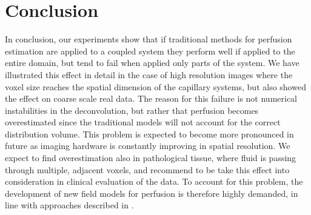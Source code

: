 \documentclass[journal,twocolumn]{IEEEtran}
\begin{document}
	\section{Conclusion}
	In conclusion, our experiments show that if traditional methods for perfusion estimation are applied to a coupled system they perform well if applied to the entire domain, but tend to fail when applied only parts of the system. 
	We have illustrated this effect in detail in the case of high resolution images where the voxel size reaches the spatial dimension of the capillary systems, but also showed the effect on coarse scale real data.
		The reason for this failure is not numerical instabilities in the deconvolution, but rather that perfusion becomes overestimated since the traditional models will not account for the correct distribution volume.
  	This problem is expected to become more pronounced in future as imaging hardware is constantly improving in spatial resolution.
	We expect to find overestimation also in pathological tissue, where fluid is passing through multiple, adjacent voxels, and recommend to be take this effect into consideration in clinical evaluation of the data. To account for this problem, the development of new field models for perfusion is therefore highly demanded, in line with approaches described in \cite{sourbron14,Michler2013}. 	
	

	
		
	
	
\end{document}
